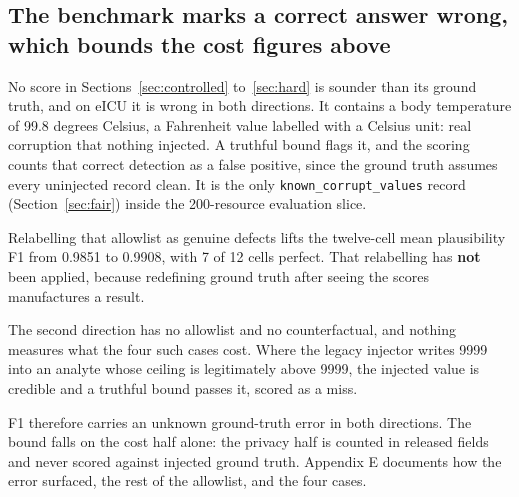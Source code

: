 \subsection{The benchmark marks a correct answer wrong, which bounds the cost figures above}
\label{sec:benchmark}

No score in Sections~\ref{sec:controlled} to~\ref{sec:hard} is sounder than its ground truth, and on
eICU it is wrong in both directions. It contains a body temperature of 99.8 degrees Celsius, a
Fahrenheit value labelled with a Celsius unit: real corruption that nothing injected. A truthful
bound flags it, and the scoring counts that correct detection as a false positive, since the ground
truth assumes every uninjected record clean. It is the only \texttt{known\_corrupt\_values} record
(Section~\ref{sec:fair}) inside the 200-resource evaluation slice.

Relabelling that allowlist as genuine defects lifts the twelve-cell mean plausibility F1 from
0.9851 to 0.9908, with 7 of 12 cells perfect. That relabelling has \textbf{not} been applied,
because redefining ground truth after seeing the scores manufactures a result.

The second direction has no allowlist and no counterfactual, and nothing measures what the four such
cases cost. Where the legacy injector writes 9999 into an analyte whose ceiling is legitimately
above 9999, the injected value is credible and a truthful bound passes it, scored as a miss.

F1 therefore carries an unknown ground-truth error in both directions. The bound falls on the cost
half alone: the privacy half is counted in released fields and never scored against injected ground
truth. Appendix E documents how the error surfaced, the rest of the allowlist, and the four cases.
